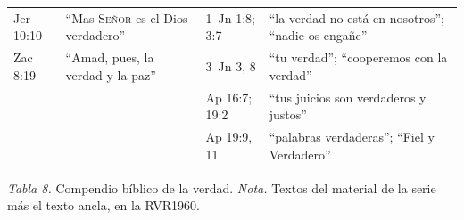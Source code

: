 \documentclass[11pt,letterpaper]{article}
\newcommand{\SENOR}{\textsc{Señor}}
\begin{document}
\begin{center}
\begin{tabular}{@{}L{2.2cm}L{5.0cm}|L{2.2cm}L{5.0cm}@{}}
Jer 10:10 & ``Mas \SENOR{} es el Dios verdadero'' & 1~Jn 1:8; 3:7 & ``la verdad no está en nosotros''; ``nadie os engañe'' \\
Zac 8:19 & ``Amad, pues, la verdad y la paz'' & 3~Jn 3, 8 & ``tu verdad''; ``cooperemos con la verdad'' \\
 & & Ap 16:7; 19:2 & ``tus juicios son verdaderos y justos'' \\
 & & Ap 19:9, 11 & ``palabras verdaderas''; ``Fiel y Verdadero'' \\
\bottomrule
\end{tabular}\par
{\footnotesize\color{gris}\textit{Tabla 8.} Compendio bíblico de la verdad. \textit{Nota.} Textos del material de la serie más el texto ancla, en la RVR1960.}
\end{center}

\end{document}
